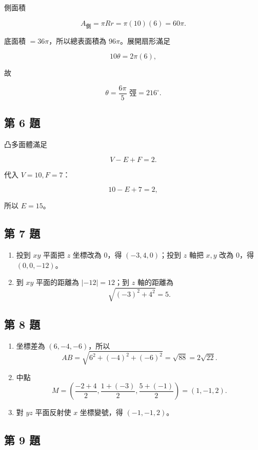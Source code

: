 \documentclass[11pt,a4paper]{article}
\providecommand{\tightlist}{%
  \setlength{\itemsep}{0pt}\setlength{\parskip}{0pt}}
\begin{document}
側面積

\[
A_{\text{側}}=\pi Rr=\pi(10)(6)=60\pi.
\]

底面積 \(=36\pi\)，所以總表面積為 \(96\pi\)。展開扇形滿足

\[
10\theta=2\pi(6),
\]

故

\[
\theta=\frac{6\pi}{5}\text{ 弳}=216^\circ.
\]

\subsection{第 6 題}\label{ux7b2c-6-ux984c}

凸多面體滿足

\[
V-E+F=2.
\]

代入 \(V=10,F=7\)：

\[
10-E+7=2,
\]

所以 \(E=15\)。

\subsection{第 7 題}\label{ux7b2c-7-ux984c}

\begin{enumerate}
\def\labelenumi{\arabic{enumi}.}
\tightlist
\item
  投到 \(xy\) 平面把 \(z\) 坐標改為 \(0\)，得 \((-3,4,0)\)；投到 \(z\) 軸把 \(x,y\) 改為 \(0\)，得 \((0,0,-12)\)。
\item
  到 \(xy\) 平面的距離為 \(|-12|=12\)；到 \(z\) 軸的距離為
  \[
  \sqrt{(-3)^2+4^2}=5.
  \]
\end{enumerate}

\subsection{第 8 題}\label{ux7b2c-8-ux984c}

\begin{enumerate}
\def\labelenumi{\arabic{enumi}.}
\tightlist
\item
  坐標差為 \((6,-4,-6)\)，所以
  \[
  AB=\sqrt{6^2+(-4)^2+(-6)^2}
  =\sqrt{88}=2\sqrt{22}.
  \]
\item
  中點
  \[
  M=\left(\frac{-2+4}{2},\frac{1+(-3)}2,\frac{5+(-1)}2\right)
  =(1,-1,2).
  \]
\item
  對 \(yz\) 平面反射使 \(x\) 坐標變號，得 \((-1,-1,2)\)。
\end{enumerate}

\subsection{第 9 題}\label{ux7b2c-9-ux984c}
\end{document}
